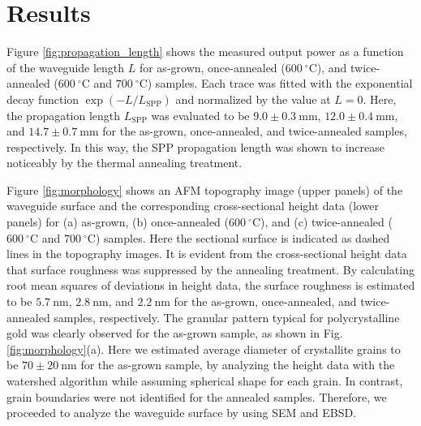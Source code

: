 \documentclass[aip,apl,reprint]{revtex4-1}
\begin{document}
\section{Results}
\label{sec:result}
Figure \ref{fig:propagation_length} shows the measured output power as a function of the waveguide length $L$ for as-grown, once-annealed ($600\:^\circ\mathrm{C}$), and twice-annealed ($600\:^\circ\mathrm{C}$ and $700\:^\circ\mathrm{C}$) samples.
Each trace was fitted with the exponential decay function $\exp(-L/L_{\mathrm{SPP}})$ and normalized by the value at $L=0$. Here, the propagation length $L_{\mathrm{SPP}}$ was evaluated to be $9.0\pm0.3\:\mathrm{mm}$, $12.0\pm0.4\:\mathrm{mm}$, and $14.7\pm0.7\:\mathrm{mm}$ for the as-grown, once-annealed, and twice-annealed samples, respectively.
In this way, the SPP propagation length was shown to increase noticeably by the thermal annealing treatment.

Figure \ref{fig:morphology} shows an AFM topography image (upper panels) of the waveguide surface and the corresponding cross-sectional height data (lower panels)  for (a) as-grown, (b) once-annealed ($600\:^\circ\mathrm{C}$), and (c) twice-annealed ($600\:^\circ\mathrm{C}$ and $700\:^\circ\mathrm{C}$) samples. Here the sectional surface is indicated as dashed lines in the topography images.
It is evident from the cross-sectional height data that surface roughness was suppressed by the annealing treatment. By calculating root mean squares of deviations in height data, the surface roughness is estimated to be $5.7\:\mathrm{nm}$, $2.8\:\mathrm{nm}$, and $2.2\:\mathrm{nm}$ for the as-grown, once-annealed, and twice-annealed samples, respectively. 
The granular pattern typical for polycrystalline gold was clearly observed for the as-grown sample, as shown in Fig. \ref{fig:morphology}(a). Here we estimated average diameter of crystallite grains to be $70\pm20\:\mathrm{nm}$ for the as-grown sample, by analyzing the height data with the watershed algorithm\cite{Petr} while assuming spherical shape for each grain. In contrast, grain boundaries were not identified for the annealed samples. Therefore, we proceeded to analyze the waveguide surface by using SEM and EBSD.
\end{document}
